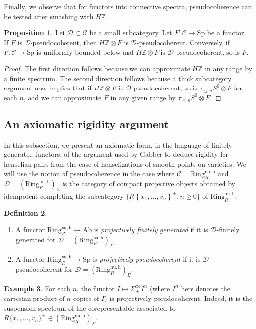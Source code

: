 \documentclass{amsart}
\newcommand{\Sp}{\mathrm{Sp}}
\theoremstyle{definition}
\newtheorem{definition}{Definition}[section]
\newtheorem{example}[definition]{Example}
\newtheorem{proposition}[definition]{Proposition}
\newcommand{\nuh}{\mathrm{Ring}^{\mathrm{nu,h}}_R}
\begin{document}
Finally, we observe that for functors into connective spectra, pseudocoherence
can be tested after smashing with $H\mathbb{Z}$. 
\begin{proposition} 
\label{HZpscoh}
Let $\mathcal{D} \subset \mathcal{C}$ be a small subcategory.
Let $F: \mathcal{C} \to \Sp$ be a functor. If $F$ is
$\mathcal{D}$-pseudocoherent, then $H\mathbb{Z}
\otimes F$ is $\mathcal{D}$-pseudocoherent. Conversely, if $F: \mathcal{C} \to \Sp$ is
uniformly bounded-below and $H \mathbb{Z} \otimes F$ is
$\mathcal{D}$-pseudocoherent, so is
$F$. 
\end{proposition} 
\begin{proof} 
The first direction follows because we can approximate $H \mathbb{Z}$ in any
range by a finite spectrum. The second direction follows because a thick subcategory
argument now implies that if $H \mathbb{Z} \otimes F$ is
$\mathcal{D}$-pseudocoherent, so is
$\tau_{\leq n} S^0 \otimes F$ for each $n$, and we can approximate $F$ in any
given range by $\tau_{\leq n} S^0 \otimes F$. 
\end{proof} 


\subsection{An axiomatic rigidity argument}\label{subsection_axiomatic}
In this subsection, we present an axiomatic form, in the language of finitely
generated functors, of the argument used by Gabber
\cite{gabber} to deduce rigidity for henselian pairs from the case of
henselizations of smooth points on varieties. 
We will use the notion of pseudocoherence in the case 
where $\mathcal{C}  = \nuh$ and $\mathcal{D} = (\nuh)_{\Sigma}$ is the category of compact projective objects 
obtained by idempotent completing the subcategory
$\{R\left\{x_1, \dots, x_n\right\}^+: n \geq 0\}$ of $ \nuh$.\begin{definition} 
\begin{enumerate}
\item  
A functor $\nuh \to \mathrm{Ab}$ is \emph{projectively finitely generated} 
if it is $\mathcal{D}$-finitely generated for $\mathcal{D} = (\nuh)_{\Sigma}$.
\item
A functor $\nuh \to \Sp$ is \emph{projectively pseudocoherent} if it
is $\mathcal{D}$-pseudocoherent for $\mathcal{D} = (\nuh)_\Sigma$. 
\end{enumerate}


\end{definition} 

\begin{example} 
\label{ex:pseudocoh}
For each $n$, 
the functor $I \mapsto \Sigma^\infty_+ I^n$ (where $I^n$ here denotes the
cartesian product of $n$ copies of $I$) is projectively pseudocoherent. Indeed, it is the
suspension spectrum of the corepresentable associated to $
R\{x_1,\dots,x_n\}^+ \in (\nuh)_\Sigma$. 
\end{example} 
\end{document}
